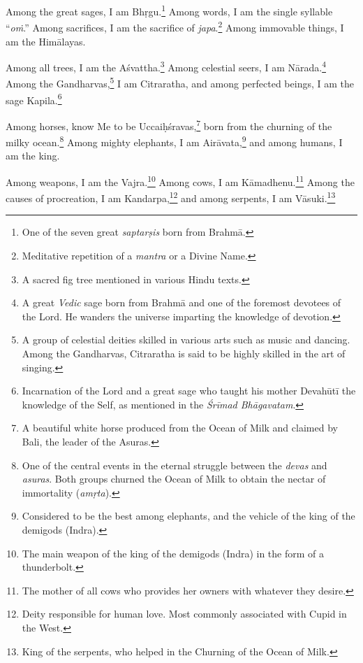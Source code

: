 {Among the great sages, I am Bhṛgu.\footnote{One of the seven great \textit{saptarṣis} born from Brahmā.} Among words, I am the single syllable \enquote{\textit{oṁ}.} Among sacrifices, I am the sacrifice of \textit{japa}.\footnote{Meditative repetition of a \textit{mantra} or a Divine Name.} Among immovable things, I am the Himālayas.}

{Among all trees, I am the Aśvattha.\footnote{A sacred fig tree mentioned in various Hindu texts.} Among celestial seers, I am Nārada.\footnote{A great \textit{Vedic} sage born from Brahmā and one of the foremost devotees of the Lord. He wanders the universe imparting the knowledge of devotion.} Among the Gandharvas,\footnote{A group of celestial deities skilled in various arts such as music and dancing. Among the Gandharvas, Citraratha is said to be highly skilled in the art of singing.} I am Citraratha, and among perfected beings, I am the sage Kapila.\footnote{Incarnation of the Lord and a great sage who taught his mother Devahūtī the knowledge of the Self, as mentioned in the \textit{Śrīmad Bhāgavatam}.}}

{Among horses, know Me to be Uccaiḥśravas,\footnote{A beautiful white horse produced from the Ocean of Milk and claimed by Bali, the leader of the Asuras.} born from the churning of the milky ocean.\footnote{One of the central events in the eternal struggle between the \textit{devas} and \textit{asuras}. Both groups churned the Ocean of Milk to obtain the nectar of immortality (\textit{amṛta}).} Among mighty elephants, I am Airāvata,\footnote{Considered to be the best among elephants, and the vehicle of the king of the demigods (Indra).} and among humans, I am the king.}

{Among weapons, I am the Vajra.\footnote{The main weapon of the king of the demigods (Indra) in the form of a thunderbolt.} Among cows, I am Kāmadhenu.\footnote{The mother of all cows who provides her owners with whatever they desire.} Among the causes of procreation, I am Kandarpa,\footnote{Deity responsible for human love. Most commonly associated with Cupid in the West.} and among serpents, I am Vāsuki.\footnote{King of the serpents, who helped in the Churning of the Ocean of Milk.}}

